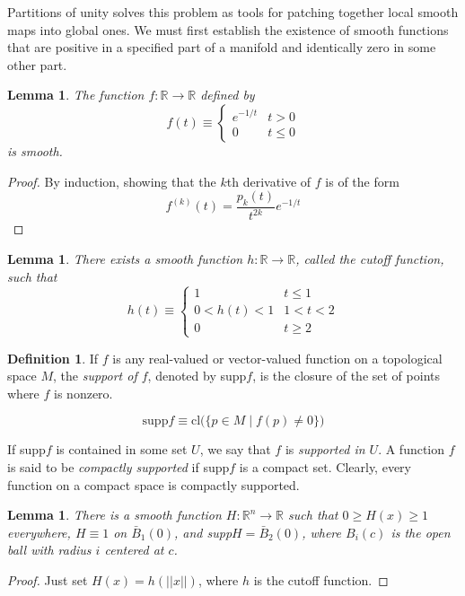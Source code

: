 \documentclass{article}
\newtheorem{lemma}[theorem]{Lemma}
\theoremstyle{remark}
\theoremstyle{definition}
\newtheorem{definition}{Definition}[section]
\begin{document}
    Partitions of unity solves this problem as tools for patching together local smooth maps into global ones. We must first establish the existence of smooth functions that are positive in a specified part of a manifold and identically zero in some other part. 

    \begin{lemma}
      The function $f: \mathbb{R} \longrightarrow \mathbb{R}$ defined by 
      \[f(t) \equiv \begin{cases}
            e^{-1/t} & t > 0 \\
            0 & t \leq 0
      \end{cases}\]
      is smooth. 
    \end{lemma}
    \begin{proof}
      By induction, showing that the $k$th derivative of $f$ is of the form
        \[f^{(k)} (t) = \frac{p_k (t)}{t^{2k}} e^{-1/t}\]
    \end{proof}

    \begin{lemma}
      There exists a smooth function $h: \mathbb{R} \longrightarrow \mathbb{R}$, called the \textit{cutoff function}, such that 
      \[h(t) \equiv \begin{cases}
            1 & t \leq 1 \\
            0 < h(t) < 1 & 1 < t < 2 \\
            0 & t \geq 2
      \end{cases}\]
    \end{lemma}

    \begin{definition}
      If $f$ is any real-valued or vector-valued function on a topological space $M$, the \textit{support of $f$}, denoted by supp$f$, is the closure of the set of points where $f$ is nonzero. 

        \[\text{supp} f \equiv \text{cl} \big(\{p \in M\;|\; f(p) \neq 0\}\big)\]

      If supp$f$ is contained in some set $U$, we say that $f$ is \textit{supported in $U$}. A function $f$ is said to be \textit{compactly supported} if supp$f$ is a compact set. Clearly, every function on a compact space is compactly supported. 
    \end{definition}

    \begin{lemma}
      There is a smooth function $H: \mathbb{R}^n \longrightarrow \mathbb{R}$ such that $0 \geq H(x) \geq 1$ everywhere, $H \equiv 1$ on $\bar{B}_1 (0)$, and supp$H = \bar{B}_2 (0)$, where $B_i (c)$ is the open ball with radius $i$ centered at $c$. 
    \end{lemma}
    \begin{proof}
      Just set $H(x) = h(||x||)$,  where $h$ is the cutoff function. 
    \end{proof}
\end{document}
